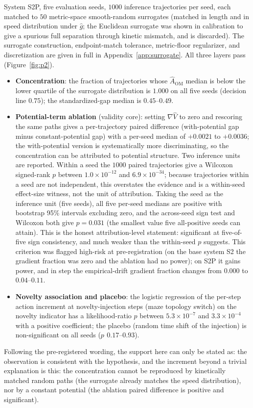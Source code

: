 \documentclass{article}
\begin{document}
System S2P, five evaluation seeds, $1000$ inference trajectories per seed, each
matched to $50$ metric-space smooth-random surrogates (matched in length and in
speed distribution under $\hat g$; the Euclidean surrogate was shown in
calibration to give a spurious full separation through kinetic mismatch, and is
discarded). The surrogate construction, endpoint-match tolerance, metric-floor
regularizer, and discretization are given in full in Appendix~\ref{app:surrogate}.
All three layers pass (Figure~\ref{fig:p2}).
\begin{itemize}
\item \textbf{Concentration}: the fraction of trajectories whose $\hat
A_{\mathrm{OM}}$ median is below the lower quartile of the surrogate distribution
is $1.000$ on all five seeds (decision line $0.75$); the standardized-gap median
is $0.45$--$0.49$.
\item \textbf{Potential-term ablation} (validity core): setting $\nabla\hat V$ to
zero and rescoring the same paths gives a per-trajectory paired difference
(with-potential gap minus constant-potential gap) with a per-seed median of
$+0.0021$ to $+0.0036$; the with-potential version is systematically more
discriminating, so the concentration can be attributed to potential structure.
Two inference units are reported. Within a seed the $1000$ paired trajectories
give a Wilcoxon signed-rank $p$ between $1.0\times10^{-12}$ and
$6.9\times10^{-34}$; because trajectories within a seed are not independent, this
overstates the evidence and is a within-seed effect-size witness, not the unit of
attribution. Taking the seed as the inference unit (five seeds), all five per-seed
medians are positive with bootstrap 95\% intervals excluding zero, and the
across-seed sign test and Wilcoxon both give $p=0.031$ (the smallest value five
all-positive seeds can attain). This is the honest attribution-level statement:
significant at five-of-five sign consistency, and much weaker than the
within-seed $p$ suggests. This criterion was flagged high-risk at pre-registration
(on the base system S2 the gradient fraction was zero and the ablation had no
power); on S2P it gains power, and in step the empirical-drift gradient fraction
changes from $0.000$ to $0.04$--$0.11$.
\item \textbf{Novelty association and placebo}: the logistic regression of the
per-step action increment at novelty-injection steps (maze topology switch) on
the novelty indicator has a likelihood-ratio $p$ between $5.3\times10^{-7}$ and
$3.3\times10^{-4}$ with a positive coefficient; the placebo (random time shift of
the injection) is non-significant on all seeds ($p\ \,0.17$--$0.93$).
\end{itemize}
Following the pre-registered wording, the support here can only be stated as:
the observation is consistent with the hypothesis, and the increment beyond a
trivial explanation is this: the concentration cannot be reproduced by kinetically
matched random paths (the surrogate already matches the speed distribution), nor
by a constant potential (the ablation paired difference is positive and
significant).
\end{document}
